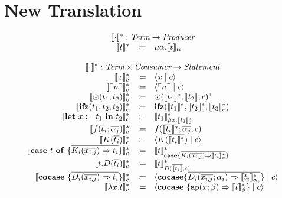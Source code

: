 \documentclass[nonacm]{acmart}
\newcommand{\translate}[1]{\ensuremath{\llbracket#1 \rrbracket}}
\newcommand{\lit}[1]{\ensuremath{\ulcorner #1\urcorner}}
\newcommand{\cut}[2]{\ensuremath{\langle #1 \mid #2 \rangle}}
\newcommand{\letin}[3]{\ensuremath{\mathbf{let}\ #1 \coloneqq #2\ \mathbf{in}\ #3}}
\newcommand{\caseof}[2]{\ensuremath{\mathbf{case}\ #1\ \mathbf{of}\ \{ #2 \}}}
\newcommand{\translatestar}[2]{\ensuremath{\llbracket #1 \rrbracket_{#2}^*}}
\begin{document}
\section{New Translation}
\label{sec:new-translation}

\[
  \begin{array}{rcl}
    \multicolumn{3}{c}{\translate{\cdot}^* : \emph{Term} \rightarrow  \emph{Producer}}\\
    \translate{t}^* & \coloneqq & \mu \alpha. \translate{t}_{\alpha}\\
    \\
    \multicolumn{3}{c}{\translate{\cdot}_{\cdot}^* : \emph{Term}\times \emph{Consumer} \rightarrow \emph{Statement}}\\
    \translatestar{x}{c} & \coloneq & \cut{x}{c} \\
    \translate{\lit{n}}_{c}^* & \coloneq & \cut{\lit{n}}{c} \\
    \translatestar{\odot(t_1,t_2)}{c} & \coloneq & \odot(\translate{t_1}^*,\translate{t_2};c)^*\\
    \translatestar{\mathbf{ifz}(t_1,t_2,t_2)}{c} & \coloneq & \mathbf{ifz}(\translate{t_1}^*,\translatestar{t_2}{c},\translatestar{t_3}{c})\\
    \translatestar{\letin{x}{t_1}{t_2}}{c} & \coloneq & \translatestar{t_1}{\tilde{\mu}x.\translatestar{t_2}{c}}\\
    \translatestar{f(\overline{t_i};\overline{\alpha_j})}{c} & \coloneq & f(\overline{\translate{t_i}^*};\overline{\alpha_j},c)\\
    \translatestar{K(\overline{t_i})}{c} & \coloneq & \cut{K(\overline{\translate{t_i}^*})}{c} \\
    \translatestar{\caseof{t}{\overline{K_i(\overline{x_{i,j}})\Rightarrow t_i}}}{c} & \coloneq & \translatestar{t}{\mathbf{case}\{ \overline{K_i(\overline{x_{i,j}})\Rightarrow \translatestar{t_i}{c}}\}}\\
    \translatestar{t.D(\overline{t_i})}{c} & \coloneq & \translatestar{t}{D(\overline{\translate{t_i}};c)}\\
    \translatestar{\mathbf{cocase}\ \{\overline{D_i(\overline{x_{i,j}}) \Rightarrow t_i}\}}{c} & \coloneq & \cut{\mathbf{cocase}\{\overline{D_i(\overline{x_{i,j}};\alpha_i)\Rightarrow \translatestar{t_i}{\alpha_i}}\}}{c}\\
    \translatestar{\lambda x.t}{c} & \coloneq & \cut{\mathbf{cocase}\ \{ \mathtt{ap}(x;\beta) \Rightarrow \translatestar{t}{\beta} \}}{c} \\

\end{array}\]
\end{document}
